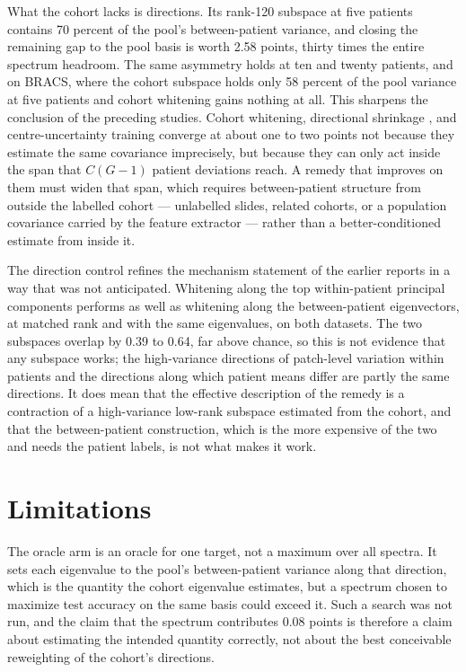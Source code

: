What the cohort lacks is directions. Its rank-120 subspace at five patients contains 70 percent of the pool's between-patient variance, and closing the remaining gap to the pool basis is worth 2.58 points, thirty times the entire spectrum headroom. The same asymmetry holds at ten and twenty patients, and on BRACS, where the cohort subspace holds only 58 percent of the pool variance at five patients and cohort whitening gains nothing at all. This sharpens the conclusion of the preceding studies. Cohort whitening, directional shrinkage \citep{queisler2026directionalShrinkage}, and centre-uncertainty training \citep{queisler2026centreUncertainty} converge at about one to two points not because they estimate the same covariance imprecisely, but because they can only act inside the span that $C(G-1)$ patient deviations reach. A remedy that improves on them must widen that span, which requires between-patient structure from outside the labelled cohort --- unlabelled slides, related cohorts, or a population covariance carried by the feature extractor --- rather than a better-conditioned estimate from inside it.

The direction control refines the mechanism statement of the earlier reports in a way that was not anticipated. Whitening along the top within-patient principal components performs as well as whitening along the between-patient eigenvectors, at matched rank and with the same eigenvalues, on both datasets. The two subspaces overlap by 0.39 to 0.64, far above chance, so this is not evidence that any subspace works; the high-variance directions of patch-level variation within patients and the directions along which patient means differ are partly the same directions. It does mean that the effective description of the remedy is a contraction of a high-variance low-rank subspace estimated from the cohort, and that the between-patient construction, which is the more expensive of the two and needs the patient labels, is not what makes it work.

\section{Limitations}
\label{sec:limitations}
The oracle arm is an oracle for one target, not a maximum over all spectra. It sets each eigenvalue to the pool's between-patient variance along that direction, which is the quantity the cohort eigenvalue estimates, but a spectrum chosen to maximize test accuracy on the same basis could exceed it. Such a search was not run, and the claim that the spectrum contributes 0.08 points is therefore a claim about estimating the intended quantity correctly, not about the best conceivable reweighting of the cohort's directions.

